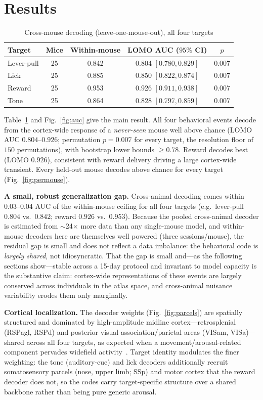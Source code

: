 \documentclass[conference]{IEEEtran}
\begin{document}
\section{Results}
\label{sec:results}
\begin{table}[t]\centering
\caption{Cross-mouse decoding (leave-one-mouse-out), all four targets}
\label{tab:main}
\begin{tabular}{lcccc}
\toprule
Target & Mice & Within-mouse & LOMO AUC ($95\%$ CI) & $p$ \\
\midrule
Lever-pull & 25 & 0.842 & 0.804 $[0.780,0.829]$ & 0.007 \\
Lick       & 25 & 0.885 & 0.850 $[0.822,0.874]$ & 0.007 \\
Reward     & 25 & 0.953 & 0.926 $[0.911,0.938]$ & 0.007 \\
Tone       & 25 & 0.864 & 0.828 $[0.797,0.859]$ & 0.007 \\
\bottomrule
\end{tabular}
\end{table}

Table~\ref{tab:main} and Fig.~\ref{fig:auc} give the main result. All four behavioral events
decode from the cortex-wide response of a \emph{never-seen} mouse well above chance
(LOMO AUC $0.804$--$0.926$; permutation $p=0.007$ for every target, the resolution floor of
$150$ permutations), with bootstrap lower bounds $\geq0.78$. Reward decodes best (LOMO $0.926$),
consistent with reward delivery driving a large cortex-wide transient. Every held-out mouse
decodes above chance for every target (Fig.~\ref{fig:permouse}).

\textbf{A small, robust generalization gap.} Cross-animal decoding comes within $0.03$--$0.04$
AUC of the within-mouse ceiling for all four targets (e.g.\ lever-pull $0.804$ vs.\ $0.842$;
reward $0.926$ vs.\ $0.953$). Because the pooled cross-animal decoder is estimated from
$\sim$24$\times$ more data than any single-mouse model,
and within-mouse decoders here are themselves well powered (three sessions/mouse), the residual
gap is small and does not reflect a data imbalance: the behavioral code is \emph{largely shared},
not idiosyncratic. That the gap is small and---as the following sections show---stable across a
15-day protocol and invariant to model capacity is the substantive claim: cortex-wide
representations of these events are largely conserved across individuals in the atlas space, and
cross-animal nuisance variability erodes them only marginally.

\textbf{Cortical localization.} The decoder weights (Fig.~\ref{fig:parcels}) are spatially
structured and dominated by high-amplitude midline cortex---retrosplenial (RSPagl, RSPd) and
posterior visual-association/parietal areas (VISam, VISa)---shared across all four targets, as
expected when a movement/arousal-related component pervades widefield activity~\cite{musall}.
Target identity modulates the finer weighting: the tone (auditory-cue) and lick decoders
additionally recruit somatosensory parcels (nose, upper limb; SSp) and motor cortex that the
reward decoder does not, so the codes carry target-specific structure over a shared backbone
rather than being pure generic arousal.
\end{document}
